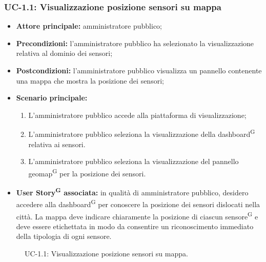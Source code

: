 \documentclass[8pt]{article}
\newcommand{\glossterm}[1]{#1\textsuperscript{G}} %
\begin{document}
\subsubsection*{UC-1.1: Visualizzazione posizione sensori su mappa}
\begin{itemize}
    \item \textbf{Attore principale:} amministratore pubblico;
    \item \textbf{Precondizioni:} l’amministratore pubblico ha selezionato la visualizzazione
        relativa al dominio dei sensori;
    \item \textbf{Postcondizioni:} l'amministratore pubblico visualizza un pannello contenente una mappa che mostra la posizione dei sensori;
    \item \textbf{Scenario principale:}
    \begin{enumerate}
      \item L’amministratore pubblico accede alla piattaforma di visualizzazione;
      \item L’amministratore pubblico seleziona la visualizzazione della \glossterm{dashboard} relativa ai sensori.
      \item L’amministratore pubblico seleziona la visualizzazione del pannello \glossterm{geomap} per la
          posizione dei sensori.
    \end{enumerate}
    \item \textbf{\glossterm{User Story} associata:} in qualità di amministratore pubblico, desidero accedere
        alla \glossterm{dashboard} per conoscere la posizione dei sensori dislocati nella città. La mappa deve indicare chiaramente la posizione di ciascun \glossterm{sensore} e deve essere etichettata in modo da consentire un riconoscimento immediato della tipologia di ogni sensore.
\end{itemize}
\begin{figure}[ht!]
    \centering
    \caption{UC-1.1: Visualizzazione posizione sensori su mappa.}
    \label{fig:UC-1.1: Visualizzazione posizione sensori su mappa}
\end{figure}
\end{document}
